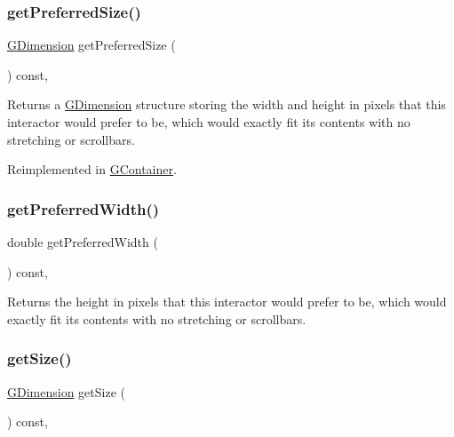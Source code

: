 \subsubsection{\texorpdfstring{get\+Preferred\+Size()}{getPreferredSize()}}
{\footnotesize\ttfamily \mbox{\hyperlink{structGDimension}{G\+Dimension}} get\+Preferred\+Size (\begin{DoxyParamCaption}{ }\end{DoxyParamCaption}) const\hspace{0.3cm}{\ttfamily [virtual]}, {\ttfamily [inherited]}}



Returns a \mbox{\hyperlink{structGDimension}{G\+Dimension}} structure storing the width and height in pixels that this interactor would prefer to be, which would exactly fit its contents with no stretching or scrollbars. 



Reimplemented in \mbox{\hyperlink{classGContainer_ac0fd6fc35681f935c67ad68078b354b8}{G\+Container}}.

\mbox{\label{classGInteractor_a82bca31d37700fb0e35d2743352efd5e}} 
\subsubsection{\texorpdfstring{get\+Preferred\+Width()}{getPreferredWidth()}}
{\footnotesize\ttfamily double get\+Preferred\+Width (\begin{DoxyParamCaption}{ }\end{DoxyParamCaption}) const\hspace{0.3cm}{\ttfamily [virtual]}, {\ttfamily [inherited]}}



Returns the height in pixels that this interactor would prefer to be, which would exactly fit its contents with no stretching or scrollbars. 

\mbox{\label{classGInteractor_a7b4eec96a2bdc6420695d5796a78eea9}} 
\subsubsection{\texorpdfstring{get\+Size()}{getSize()}}
{\footnotesize\ttfamily \mbox{\hyperlink{structGDimension}{G\+Dimension}} get\+Size (\begin{DoxyParamCaption}{ }\end{DoxyParamCaption}) const\hspace{0.3cm}{\ttfamily [virtual]}, {\ttfamily [inherited]}}



